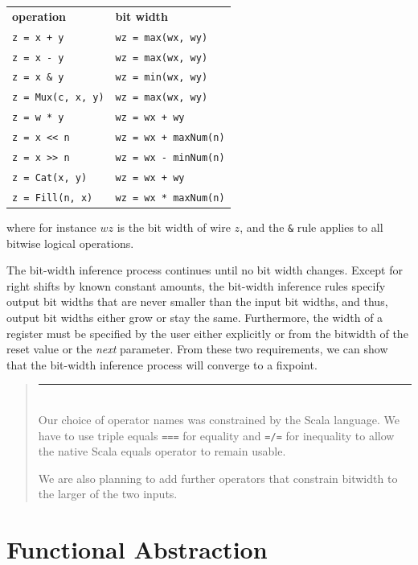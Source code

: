 \documentclass[twocolumn,10pt]{article}
\newcommand{\comment}[1]{\emph{Comment: #1}}
\renewcommand{\comment}[1]{}
\newenvironment{commentary}
{ \vspace{-0.1in}
  \begin{quotation}
  \noindent
  \small \em
  \rule{\linewidth}{1pt}\\
}
{
  \end{quotation}
}
\def\code#1{{\tt #1}}
\begin{document}
\begin{tabular}{ll}
{\bf operation} & {\bf bit width} \\ 
\verb|z = x + y| & \verb|wz = max(wx, wy)| \\
\verb+z = x - y+ & \verb|wz = max(wx, wy)|\\
\verb+z = x & y+ & \verb+wz = min(wx, wy)+ \\
\verb+z = Mux(c, x, y)+ & \verb+wz = max(wx, wy)+ \\
\verb+z = w * y+ & \verb!wz = wx + wy! \\
\verb+z = x << n+ & \verb!wz = wx + maxNum(n)! \\
\verb+z = x >> n+ & \verb+wz = wx - minNum(n)+ \\
\verb+z = Cat(x, y)+ & \verb!wz = wx + wy! \\
\verb+z = Fill(n, x)+ & \verb+wz = wx * maxNum(n)+ \\
\end{tabular}

\noindent
where for instance $wz$ is the bit width of wire $z$, and the \verb+&+
rule applies to all bitwise logical operations.

\comment{maxNum and MinNum need to be explained.}

The bit-width inference process continues until no bit width changes.
Except for right shifts by known constant amounts, the bit-width
inference rules specify output bit widths that are never smaller than
the input bit widths, and thus, output bit widths either grow or stay
the same.  Furthermore, the width of a register must be specified by
the user either explicitly or from the bitwidth of the reset value or
the \emph{next} parameter.
From these two requirements, we can show that the bit-width inference
process will converge to a fixpoint.

\begin{commentary}
Our choice of operator names was constrained by the Scala language.
We have to use triple equals \code{===} for equality and \code{=/=}
for inequality to allow the
native Scala equals operator to remain usable.

We are also planning to add further operators that constrain bitwidth
to the larger of the two inputs.
\end{commentary}

\section{Functional Abstraction}
\end{document}
